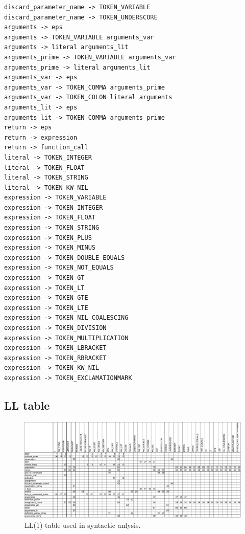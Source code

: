 \documentclass[11pt]{article}
\begin{document}
\begin{lstlisting}[style=PseudoStyle, caption=LL (1) grammar example]
discard_parameter_name -> TOKEN_VARIABLE
discard_parameter_name -> TOKEN_UNDERSCORE
arguments -> eps
arguments -> TOKEN_VARIABLE arguments_var
arguments -> literal arguments_lit
arguments_prime -> TOKEN_VARIABLE arguments_var
arguments_prime -> literal arguments_lit
arguments_var -> eps
arguments_var -> TOKEN_COMMA arguments_prime
arguments_var -> TOKEN_COLON literal arguments
arguments_lit -> eps
arguments_lit -> TOKEN_COMMA arguments_prime
return -> eps
return -> expression
return -> function_call
literal -> TOKEN_INTEGER
literal -> TOKEN_FLOAT
literal -> TOKEN_STRING
literal -> TOKEN_KW_NIL
expression -> TOKEN_VARIABLE
expression -> TOKEN_INTEGER
expression -> TOKEN_FLOAT
expression -> TOKEN_STRING
expression -> TOKEN_PLUS
expression -> TOKEN_MINUS
expression -> TOKEN_DOUBLE_EQUALS
expression -> TOKEN_NOT_EQUALS
expression -> TOKEN_GT
expression -> TOKEN_LT
expression -> TOKEN_GTE
expression -> TOKEN_LTE
expression -> TOKEN_NIL_COALESCING
expression -> TOKEN_DIVISION
expression -> TOKEN_MULTIPLICATION
expression -> TOKEN_LBRACKET
expression -> TOKEN_RBRACKET
expression -> TOKEN_KW_NIL
expression -> TOKEN_EXCLAMATIONMARK
\end{lstlisting}




\begin{landscape}
\null
\vfill

\subsection{LL table}

\begin{figure}[h]
	\centering
	\includegraphics[scale=0.7]{LLtable.pdf}
	\caption{LL(1) table used in syntactic anlysis.}
	\label{fig:lltable}
\end{figure}


\vfill
\end{landscape}
\end{document}
